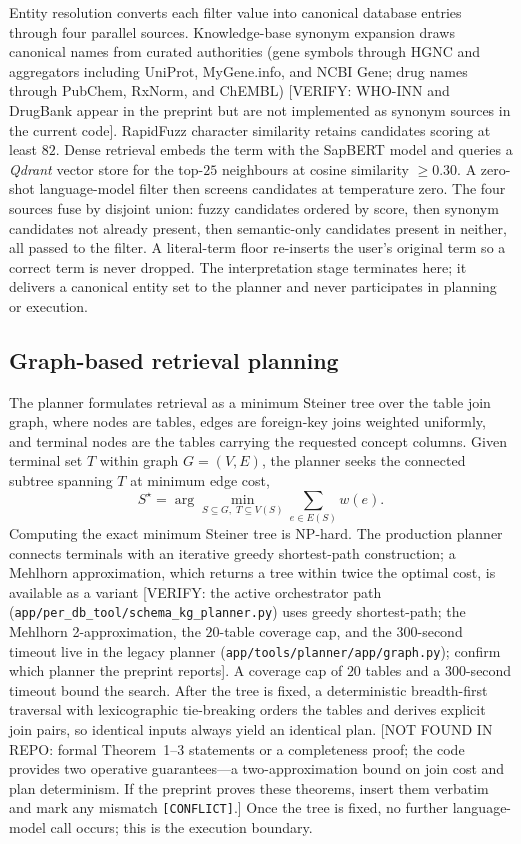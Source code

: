 Entity resolution converts each filter value into canonical database entries through four parallel sources. Knowledge-base synonym expansion draws canonical names from curated authorities (gene symbols through HGNC and aggregators including UniProt, MyGene.info, and NCBI Gene; drug names through PubChem, RxNorm, and ChEMBL) [VERIFY: WHO-INN and DrugBank appear in the preprint but are not implemented as synonym sources in the current code]. RapidFuzz character similarity retains candidates scoring at least $82$. Dense retrieval embeds the term with the SapBERT model and queries a \textit{Qdrant} vector store for the top-$25$ neighbours at cosine similarity $\geq 0.30$. A zero-shot language-model filter then screens candidates at temperature zero. The four sources fuse by disjoint union: fuzzy candidates ordered by score, then synonym candidates not already present, then semantic-only candidates present in neither, all passed to the filter. A literal-term floor re-inserts the user's original term so a correct term is never dropped. The interpretation stage terminates here; it delivers a canonical entity set to the planner and never participates in planning or execution.

\subsection*{Graph-based retrieval planning}

The planner formulates retrieval as a minimum Steiner tree over the table join graph, where nodes are tables, edges are foreign-key joins weighted uniformly, and terminal nodes are the tables carrying the requested concept columns. Given terminal set $T$ within graph $G=(V,E)$, the planner seeks the connected subtree spanning $T$ at minimum edge cost,
\begin{equation}
S^{\star} = \arg\min_{S \subseteq G,\; T \subseteq V(S)} \sum_{e \in E(S)} w(e).
\label{eq:steiner}
\end{equation}
Computing the exact minimum Steiner tree is NP-hard. The production planner connects terminals with an iterative greedy shortest-path construction; a Mehlhorn approximation, which returns a tree within twice the optimal cost, is available as a variant [VERIFY: the active orchestrator path (\texttt{app/per\_db\_tool/schema\_kg\_planner.py}) uses greedy shortest-path; the Mehlhorn 2-approximation, the $20$-table coverage cap, and the $300$-second timeout live in the legacy planner (\texttt{app/tools/planner/app/graph.py}); confirm which planner the preprint reports]. A coverage cap of $20$ tables and a $300$-second timeout bound the search. After the tree is fixed, a deterministic breadth-first traversal with lexicographic tie-breaking orders the tables and derives explicit join pairs, so identical inputs always yield an identical plan. [NOT FOUND IN REPO: formal Theorem~1--3 statements or a completeness proof; the code provides two operative guarantees---a two-approximation bound on join cost and plan determinism. If the preprint proves these theorems, insert them verbatim and mark any mismatch \texttt{[CONFLICT]}.] Once the tree is fixed, no further language-model call occurs; this is the execution boundary.

